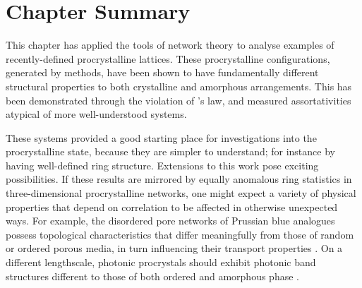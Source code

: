 \section{Chapter Summary}

This chapter has applied the tools of network theory to analyse \td{} examples of recently\--defined procrystalline lattices.
These procrystalline configurations, generated by \mc{} methods, have been shown to have fundamentally different structural properties to both crystalline and amorphous arrangements.
This has been demonstrated through the violation of \lm's law, and measured assortativities atypical of more well\--understood systems.

These \td{} systems provided a good starting place for investigations into the procrystalline state, because they are simpler to understand; for instance by having well\--defined ring structure.
Extensions to this work pose exciting possibilities.
If these results are mirrored by equally anomalous ring statistics in three\--dimensional procrystalline networks, one might expect a variety of physical properties that depend on correlation to be affected in otherwise unexpected ways. 
For example, the disordered pore networks of Prussian blue analogues possess topological characteristics that differ meaningfully from those of random or ordered porous media, in turn influencing their transport properties \cite{Simonov2020}.
On a different lengthscale, photonic procrystals should exhibit photonic band structures different to those of both ordered and amorphous phase \cite{Florescu2009,Sellers2017}.
